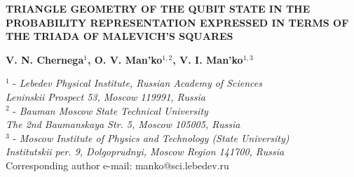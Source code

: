 \documentclass[12pt]{article}
\def\baselinestretch{1.5}
\begin{document}
\begin{center}
\bf{TRIANGLE GEOMETRY OF THE QUBIT STATE 
IN THE PROBABILITY REPRESENTATION EXPRESSED 
IN TERMS OF THE TRIADA OF MALEVICH'S  SQUARES}\\
\end{center}
\bigskip

\begin{center} {\bf V. N. Chernega$^1$, O. V. Man'ko$^{1,2}$, V. I. Man'ko$^{1,3}$}
\end{center}

\medskip

\begin{center}
$^1$ - {\it Lebedev Physical Institute, Russian Academy of Sciences\\
Leninskii Prospect 53, Moscow 119991, Russia}\\
$^2$ - {\it Bauman Moscow State Technical University\\
The 2nd Baumanskaya Str. 5, Moscow 105005, Russia}\\
$^3$ - {\it Moscow Institute of Physics and Technology (State University)\\
Institutskii per. 9, Dolgoprudnyi, Moscow Region 141700, Russia}\\
Corresponding author e-mail: manko@sci.lebedev.ru
\end{center}






%
\end{document}
